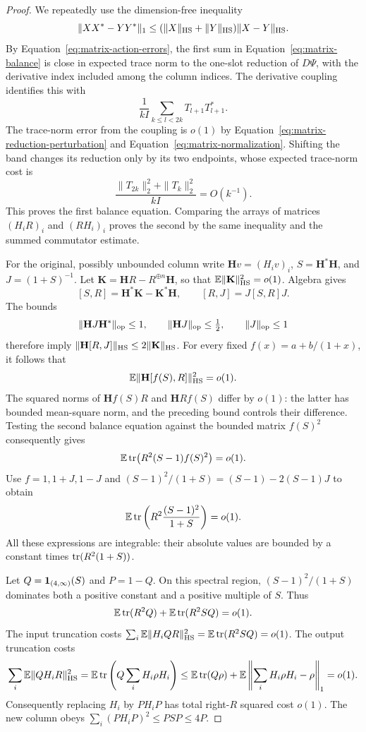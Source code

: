 \begin{proof}
We repeatedly use the dimension-free inequality
\begin{equation}\label{eq:matrix-reduction-perturbation}
 \|XX^*-YY^*\|_1
 \le(\|X\|_{\mathrm{HS}}+\|Y\|_{\mathrm{HS}})\|X-Y\|_{\mathrm{HS}}.
\end{equation}
By Equation~\eqref{eq:matrix-action-errors}, the first sum in
Equation~\eqref{eq:matrix-balance} is close in expected trace norm to the
one-slot reduction of $D\Psi$, with the derivative index included among
the column indices.  The derivative coupling identifies this with
\[
 \frac1{kI}\sum_{k\le l<2k}T_{l+1}T_{l+1}^*.
\]
The trace-norm error from the coupling is $o(1)$ by
Equation~\eqref{eq:matrix-reduction-perturbation} and
Equation~\eqref{eq:matrix-normalization}.  Shifting the band changes its
reduction only by its two endpoints, whose expected trace-norm cost is
\[
 \frac{\|T_{2k}\|_2^2+\|T_k\|_2^2}{kI}=O(k^{-1}).
\]
This proves the first balance equation.  Comparing the arrays of matrices
$(H_iR)_i$ and $(RH_i)_i$ proves the second by the same inequality and the
summed commutator estimate.

For the original, possibly unbounded column write
$\mathbf H v=(H_iv)_i$, $S=\mathbf H^*\mathbf H$, and $J=(1+S)^{-1}$.
Let $\mathbf K=\mathbf HR-R^{\oplus n}\mathbf H$, so that
$\mathbb E\|\mathbf K\|_{\mathrm{HS}}^2=o(1)$.  Algebra gives
\[
 [S,R]=\mathbf H^*\mathbf K-\mathbf K^*\mathbf H,
 \qquad [R,J]=J[S,R]J.
\]
The bounds
\[
 \|\mathbf HJ\mathbf H^*\|_{\mathrm{op}}\le1,\qquad
 \|\mathbf HJ\|_{\mathrm{op}}\le\tfrac12,\qquad \|J\|_{\mathrm{op}}\le1
\]
therefore imply $\|\mathbf H[R,J]\|_{\mathrm{HS}}\le2\|\mathbf K\|_{\mathrm{HS}}$.
For every fixed $f(x)=a+b/(1+x)$, it follows that
\[
 \mathbb E\|\mathbf H[f(S),R]\|_{\mathrm{HS}}^2=o(1).
\]
The squared norms of $\mathbf Hf(S)R$ and $\mathbf HRf(S)$ differ by $o(1)$:
the latter has bounded mean-square norm, and the preceding bound controls
their difference.  Testing the second balance equation against the bounded
matrix $f(S)^2$ consequently gives
\[
 \mathbb E\operatorname{tr}\bigl(R^2(S-1)f(S)^2\bigr)=o(1).
\]
Use $f=1,1+J,1-J$ and
$(S-1)^2/(1+S)=(S-1)-2(S-1)J$ to obtain
\begin{equation}\label{eq:matrix-column-tail}
 \mathbb E\operatorname{tr}\left(R^2\frac{(S-1)^2}{1+S}\right)=o(1).
\end{equation}
All these expressions are integrable: their absolute values are bounded
by a constant times $\operatorname{tr}(R^2(1+S))$.

Let $Q=\mathbf 1_{(4,\infty)}(S)$ and $P=1-Q$.  On this spectral region,
$(S-1)^2/(1+S)$ dominates both a positive constant and a positive multiple
of $S$.  Thus
\[
 \mathbb E\operatorname{tr}(R^2Q)+\mathbb E\operatorname{tr}(R^2SQ)=o(1).
\]
The input truncation costs
$\sum_i\mathbb E\|H_iQR\|_{\mathrm{HS}}^2=\mathbb E\operatorname{tr}(R^2SQ)=o(1)$.
The output truncation costs
\[
 \sum_i\mathbb E\|QH_iR\|_{\mathrm{HS}}^2
 =\mathbb E\operatorname{tr}\left(Q\sum_iH_i\rho H_i\right)
 \le\mathbb E\operatorname{tr}(Q\rho)+\mathbb E\left\|\sum_iH_i\rho H_i-\rho\right\|_1=o(1).
\]
Consequently replacing $H_i$ by $PH_iP$ has total right-$R$ squared cost
$o(1)$.  The new column obeys
$\sum_i(PH_iP)^2\le PSP\le4P$.


\end{proof}
